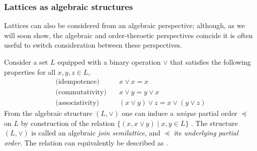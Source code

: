 \subsubsection{Lattices as algebraic structures}
\label{subsubsection:lattices-as-algebraic-structures}

Lattices can also be considered from an algebraic perspective; although, as we will soon show, the algebraic and order-theroetic perspectives coincide it is often useful to switch consideration between these perspectives.

Consider a set $L$ equipped with a binary operation $\vee$ that satisfies the following properties for all $x,y,z \in L$,
%
\begin{align}
  \text{(idempotence)} & \quad x \vee x = x \label{eq:idempotence} \\
  \text{(commutativity)} & \quad x \vee y = y \vee x \label{eq:commutativity} \\
  \text{(associativity)} & \quad (x \vee y) \vee z = x \vee (y \vee z) \label{eq:associativity}
\end{align}
%
From the algebraic structure $(L, \vee)$ one can induce a \textit{unique} partial order $\preceq$ on $L$ by construction of the relation $\{(x, x \vee y) \mid x,y \in L \}$ \cite[pp. 173]{bergman2015invitation}. The structure $(L, \vee)$ is called an algebraic \textit{join semilattice}, and $\preceq$ its \textit{underlying partial order}. The relation can equivalently be described as  \cite[pp.173]{bergman2015invitation}.
%
